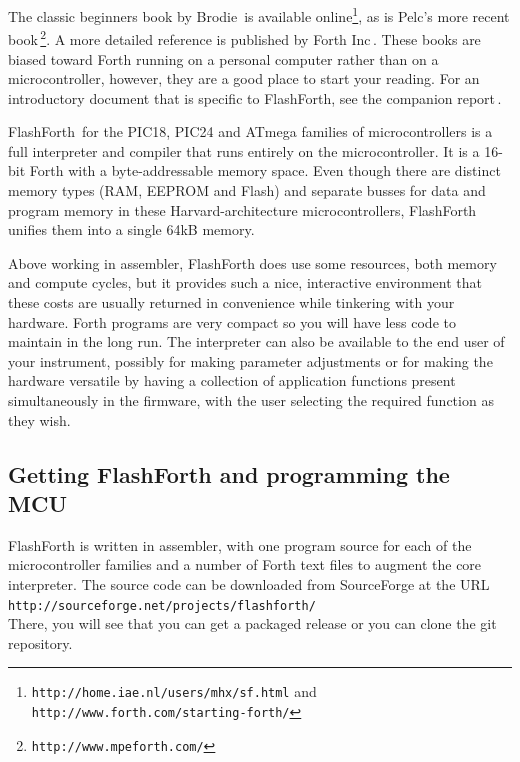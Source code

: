 \documentclass[12pt,a4paper]{article}
\begin{document}
\medskip\noindent
The classic beginners book by Brodie\,\cite{brodie_1987a}
is available online\footnote{\texttt{http://home.iae.nl/users/mhx/sf.html} 
and \texttt{http://www.forth.com/starting-forth/}},
as is Pelc's more recent book\,\cite{pelc_2011a}\footnote{\texttt{http://www.mpeforth.com/}}.
A more detailed reference is published by Forth Inc\,\cite{conklin_rather_2007a}.
These books are biased toward Forth running on a personal computer rather than on
a microcontroller, however, they are a good place to start your reading. 
For an introductory document that is specific to FlashForth, 
see the companion report\,\cite{jacobs_etal_2013b}.

\medskip\noindent
FlashForth\,\cite{nordman_2014a} for the PIC18, PIC24 and ATmega families of microcontrollers 
is a full interpreter and compiler that runs entirely on the microcontroller.
It is a 16-bit Forth with a byte-addressable memory space.
Even though there are distinct memory types (RAM, EEPROM and Flash) and 
separate busses for data and program memory in these Harvard-architecture
microcontrollers, FlashForth unifies them into a single 64kB memory.

\medskip\noindent
Above working in assembler, FlashForth does use some resources, both memory and compute cycles, 
but it provides such a nice, interactive environment that these costs are usually returned 
in convenience while tinkering with your hardware.
Forth programs are very compact so you will have less code to maintain in the long run.
The interpreter can also be available to the end user of your instrument, possibly
for making parameter adjustments or for making the hardware versatile by having a 
collection of application functions present simultaneously in the firmware, 
with the user selecting the required function as they wish.


\bigskip
\subsection{Getting FlashForth and programming the MCU}
%
FlashForth is written in assembler, with one program source for each of 
the microcontroller families and a number of Forth text files to augment the
core interpreter.
The source code can be downloaded from SourceForge at the URL\\
\texttt{http://sourceforge.net/projects/flashforth/}\\
There, you will see that you can get a packaged release or you can clone the git repository.
\end{document}
